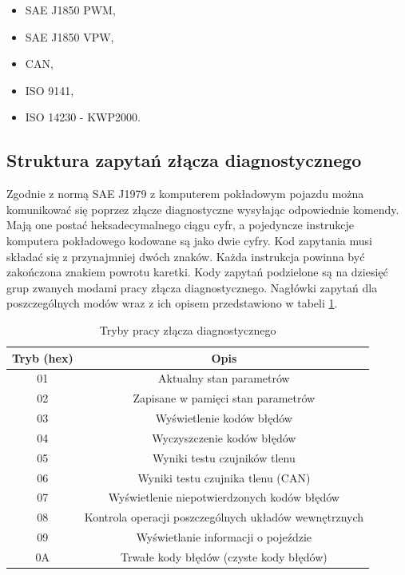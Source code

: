\documentclass[12pt]{article} %
\numberwithin{equation}{subsection}
\numberwithin{figure}{section}
\numberwithin{table}{section}
\begin{document}
		\begin{itemize}
			\item{SAE J1850 PWM,}
			\item{SAE J1850 VPW,}
			\item{CAN,}
			\item{ISO 9141,}
			\item{ISO 14230 - KWP2000.}
		\end{itemize}
		
		\newpage
		
		\subsection{Struktura zapytań złącza diagnostycznego}
		
		\hspace{0.5cm}Zgodnie z normą SAE J1979 z komputerem pokładowym pojazdu można komunikować się poprzez złącze diagnostyczne wysyłając odpowiednie komendy. Mają one postać heksadecymalnego ciągu cyfr, a pojedyncze instrukcje komputera pokładowego kodowane są jako dwie cyfry. Kod zapytania musi składać się z przynajmniej dwóch znaków. Każda instrukcja powinna być zakończona znakiem powrotu karetki. Kody zapytań podzielone są na dziesięć grup zwanych modami pracy złącza diagnostycznego. Nagłówki zapytań dla poszczególnych modów wraz z ich opisem przedstawiono w tabeli \ref{tab_pid_modes}.
		
		\begin{table}[ht]
\centering
\caption{Tryby pracy złącza diagnostycznego}
\label{tab_pid_modes}
\begin{tabular}{|c|c|}
\hline
\textbf{Tryb (hex)} & \textbf{Opis}                                                               \\ \hline
01                  & Aktualny stan parametrów                              \\ \hline
02                  & Zapisane w pamięci stan parametrów                      \\ \hline
03                  & Wyświetlenie kodów błędów                                                        \\ \hline
04                  & Wyczyszczenie kodów błędów            \\ \hline
05                  & Wyniki testu czujników tlenu \\ \hline
06                  & Wyniki testu czujnika tlenu (CAN)                             \\ \hline
07                  & Wyświetlenie niepotwierdzonych kodów błędów         \\ \hline
08                  & Kontrola operacji poszczególnych układów wewnętrznych                       \\ \hline
09                  & Wyświetlanie informacji o pojeździe                                                           \\ \hline
0A                  & Trwałe kody błędów (czyste kody błędów)                                     \\ \hline
\end{tabular}
\end{table}
\end{document}
